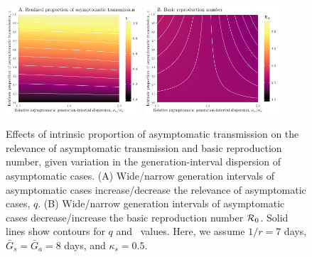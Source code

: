 \begin{figure}[!ht]
\begin{center}
\includegraphics[width=0.45\textwidth]{figheatmap_kappa.pdf}
\mbox{\hspace{0.05\textwidth}}
\includegraphics[width=0.45\textwidth]{figheatmap_kappa_R0.pdf}
\caption{Effects of intrinsic proportion of asymptomatic transmission on the relevance of asymptomatic transmission and basic reproduction number, given variation in
the generation-interval dispersion of asymptomatic cases.
(A) Wide/narrow generation intervals of asymptomatic cases increase/decrease the relevance of asymptomatic cases, $q$.
(B) Wide/narrow generation intervals of asymptomatic cases decrease/increase the basic reproduction number ${\cal{R}}_0$.
Solid lines show contours for $q$ and \Ro\ values.
Here, we assume $1/r=7$ days, $\bar G_s=\bar G_a=8$ days, and $\kappa_s=0.5$.
}
\end{center}
\end{figure}

